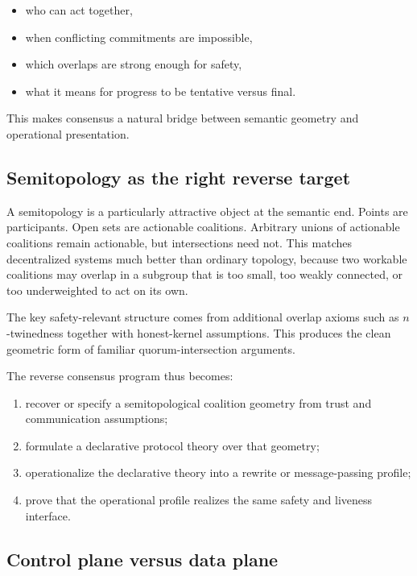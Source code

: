 \documentclass[11pt]{article}
\begin{document}
\begin{itemize}
  \item who can act together,
  \item when conflicting commitments are impossible,
  \item which overlaps are strong enough for safety,
  \item what it means for progress to be tentative versus final.
\end{itemize}

This makes consensus a natural bridge between semantic geometry and operational presentation.

\subsection{Semitopology as the right reverse target}

A semitopology is a particularly attractive object at the semantic end. Points are participants. Open sets are actionable coalitions. Arbitrary unions of actionable coalitions remain actionable, but intersections need not. This matches decentralized systems much better than ordinary topology, because two workable coalitions may overlap in a subgroup that is too small, too weakly connected, or too underweighted to act on its own.

The key safety-relevant structure comes from additional overlap axioms such as $n$-twinedness together with honest-kernel assumptions. This produces the clean geometric form of familiar quorum-intersection arguments.

The reverse consensus program thus becomes:

\begin{enumerate}
  \item recover or specify a semitopological coalition geometry from trust and communication assumptions;
  \item formulate a declarative protocol theory over that geometry;
  \item operationalize the declarative theory into a rewrite or message-passing profile;
  \item prove that the operational profile realizes the same safety and liveness interface.
\end{enumerate}

\subsection{Control plane versus data plane}
\end{document}
